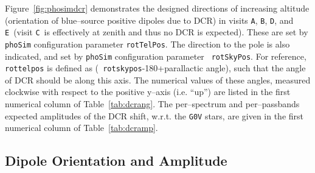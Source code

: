 \documentclass[DM,toc]{lsstdoc}
\def\A{{\tt A}}
\def\B{{\tt B}}
\def\C{{\tt C}}
\def\D{{\tt D}}
\def\E{{\tt E}}
\begin{document}
Figure~\ref{fig:phosimdcr} demonstrates the designed directions of
increasing altitude (orientation of blue--source positive dipoles due
to DCR) in visits \A, \B, \D, and \E\ (visit \C\ is effectively at
zenith and thus no DCR is expected).  These are set by {\tt phoSim}
configuration parameter {\tt rotTelPos}.  The direction to the pole is
also indicated, and set by {\tt phoSim} configuration parameter {\tt
  rotSkyPos}.  For reference, {\tt rottelpos} is defined as ({\tt
  rotskypos}-180+parallactic angle), such that the angle of DCR should
be along this axis.  The numerical values of these angles, measured
clockwise with respect to the positive y--axis (i.e. ``up'') are
listed in the first numerical column of Table~\ref{tab:dcrang}.  The
per--spectrum and per--passbands expected amplitudes of the DCR shift,
w.r.t. the {\tt G0V} stars, are given in the first numerical column of
Table~\ref{tab:dcramp}.

\subsection{Dipole Orientation and Amplitude}
\end{document}
